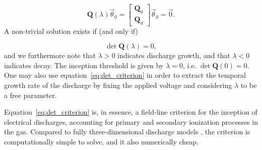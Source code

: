 \documentclass{iopjournal}
\begin{document}
\begin{equation}
  \bm{Q}(\lambda)\vec{\theta}_0 = \begin{bmatrix} \bm{Q}_0 \\ \bm{Q}_d \end{bmatrix} \vec{\theta}_0 = \vec{0}.
\end{equation}
A non-trivial solution exists if (and only if)

\begin{equation}
  \label{eq:det_criterion}
  \det\bm{Q}(\lambda) = 0,
\end{equation}
and we furthermore note that $\lambda > 0$ indicates discharge growth, and that $\lambda < 0$ indicates decay.
The inception threshold is given by $\lambda = 0$, i.e. $\det \bm{Q}(0) = 0$.
One may also use equation~\eqref{eq:det_criterion} in order to extract the temporal growth rate of the discharge by fixing the applied voltage and considering $\lambda$ to be a free parameter.

Equation~\eqref{eq:det_criterion} is, in essence, a field-line criterion for the inception of electrical discharges, accounting for primary and secondary ionization processes in the gas.
Compared to fully three-dimensional discharge models \cite{Marskar2019a}, the criterion is computationally simple to solve, and it also numerically cheap.



\end{document}

